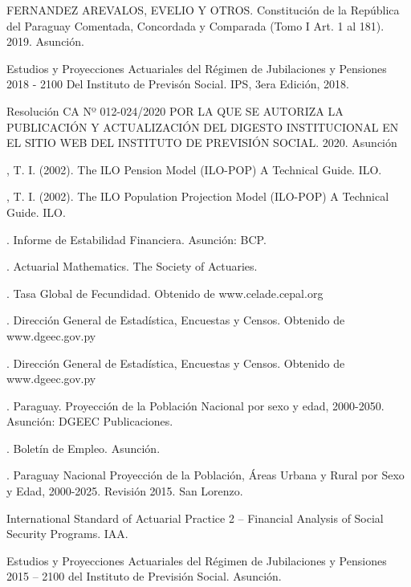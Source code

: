 \documentclass[a4paper,11pt]{article}
\begin{document}
\begin{thebibliography}{0}

  FERNANDEZ AREVALOS, EVELIO Y OTROS. Constitución de la República del Paraguay Comentada, Concordada y Comparada (Tomo I Art. 1 al 181). 2019. Asunción.
 
   Estudios y Proyecciones Actuariales del Régimen de Jubilaciones y Pensiones 2018 - 2100 Del Instituto de Previsón Social. IPS, 3era Edición, 2018.
  
   Resolución CA Nº 012-024/2020 POR LA QUE SE AUTORIZA LA PUBLICACIÓN Y ACTUALIZACIÓN DEL DIGESTO INSTITUCIONAL EN EL SITIO WEB DEL INSTITUTO DE PREVISIÓN SOCIAL. 2020. Asunción
  
  , T. I. (2002). The ILO Pension Model (ILO-POP) A Technical Guide. ILO.
  
  , T. I. (2002). The ILO Population Projection Model (ILO-POP) A Technical Guide. ILO.

  . Informe de Estabilidad Financiera. Asunción: BCP.

  . Actuarial Mathematics. The Society of Actuaries.
  
  . Tasa Global de Fecundidad. Obtenido de www.celade.cepal.org

  . Dirección General de Estadística, Encuestas y Censos. Obtenido de www.dgeec.gov.py

  . Dirección General de Estadística, Encuestas y Censos. Obtenido de www.dgeec.gov.py

 . Paraguay. Proyección de la Población Nacional por sexo y edad, 2000-2050. Asunción: DGEEC Publicaciones.

  . Boletín de Empleo. Asunción.

  . Paraguay Nacional Proyección de la Población, Áreas Urbana y Rural por Sexo y Edad, 2000-2025. Revisión 2015. San Lorenzo.

   International Standard of Actuarial Practice 2 – Financial Analysis of Social Security Programs. IAA.

     Estudios y Proyecciones Actuariales del Régimen de Jubilaciones y Pensiones 2015 – 2100 del Instituto de Previsión Social. Asunción.


\end{thebibliography}
\end{document}
